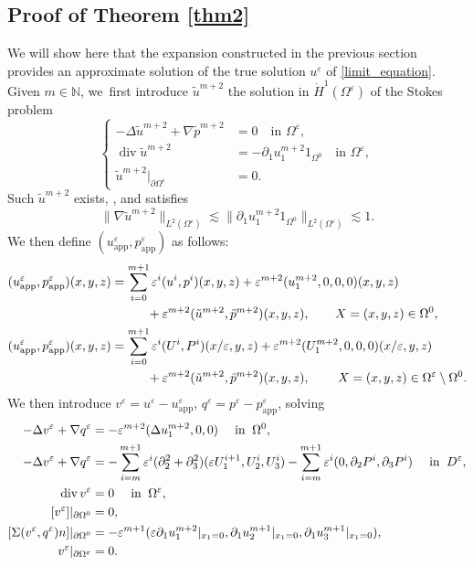 \documentclass[10pt]{amsart}
\newcommand{\app}{\mathrm{app}}
\renewcommand{\div}{\operatorname{div}}
\theoremstyle{plain}
\theoremstyle{definition}
\let\pa\partial
\let\na\nabla
\let\eps\varepsilon
\newcommand{\N}{\mathbb{N}}
\begin{document}
\subsection{Proof of Theorem \ref{thm2}}
We will show here that the expansion constructed in the previous section provides an approximate solution of the true solution $u^\eps$ of \eqref{limit_equation}. Given $m \in \N$, we~first introduce $\tilde{u}^{m+2}$ the solution in $\dot{H}^1(\Omega^\eps)$ of the Stokes problem
\begin{equation*}
\left\{
\begin{aligned}
-\Delta \tilde{u}^{m+2} + \na \tilde{p}^{m+2} & = 0 \quad \text{in } \Omega^\eps, \\
\div \tilde{u}^{m+2} & = - \pa_1 u^{m+2}_1 1_{\Omega^0} \quad \text{in } \Omega^\eps, \\
\tilde{u}^{m+2}\vert_{\pa \Omega^\eps} & = 0.
\end{aligned}
\right.
\end{equation*}
Such $\tilde{u}^{m+2}$ exists, \cf \cite[Th.\,IV.3.3]{Galdi}, and satisfies
\[
\|\na \tilde{u}^{m+2}\|_{L^2(\Omega^\eps)} \lesssim \|\pa_1 u^{m+2}_1 1_{\Omega^0} \|_{L^2(\Omega^\eps)} \lesssim 1.
\]
We then define $(u^\eps_{\app}, p^{\eps}_{\app})$ as follows:
\begin{equation*}
\begin{aligned}
(u^\eps_{\app},p^\eps_{\app})(x,y,z) & = \sum_{i=0}^{m+1} \eps^i (u^i, p^i)(x,y,z) + \eps^{m+2} (u^{m+2}_1,0,0,0)(x,y,z) \\
& \hspace*{1cm}+ \eps^{m+2} (\tilde{u}^{m+2},\tilde{p}^{m+2})(x,y,z), \qquad X = (x,y,z) \in \Omega^0, \\
(u^\eps_{\app}, p^\eps_{\app})(x,y,z) & = \sum_{i=0}^{m+1} \eps^i (U^i, P^i)(x/\eps,y,z) + \eps^{m+2} (U^{m+2}_1,0,0,0)(x/\eps,y,z) \\
& \hspace*{1cm}+ \eps^{m+2} (\tilde{u}^{m+2},\tilde{p}^{m+2})(x,y,z), \qquad \: X = (x,y,z) \in \Omega^\eps\setminus\Omega^0.
\end{aligned}
\end{equation*}
We then introduce $v^\eps = u^\eps - u^\eps_{\app}$, $q^\eps = p^\eps - p^\eps_{\app}$, solving
\begin{align}
-\Delta v^\eps + \na q^\eps & = - \eps^{m+2} (\Delta u^{m+2}_1,0,0) \quad \text{ in } \: \Omega^0,\notag \\
-\Delta v^\eps + \na q^\eps & = - \sum_{i=m}^{m+1} \eps^i (\pa^2_2 + \pa^2_3) (\eps U^{i+1}_1,U^i_2,U^i_3) - \sum_{i=m}^{m+1} \eps^i (0, \pa_2 P^i, \pa_3 P^i) \quad \text{ in } \: D^\eps, \notag \\
\div v^\eps & = 0 \quad \text{ in } \: \Omega^\eps, \\
[v^\eps]\vert_{\pa \Omega^0} & = 0, \notag\\
[\Sigma(v^\eps,q^\eps)n]\vert_{\pa \Omega^0} & = - \eps^{m+1}(\eps \pa_1 u^{m+2}_1\vert_{x_1=0},\pa_1 u^{m+1}_2\vert_{x_1=0}, \pa_1 u^{m+1}_3\vert_{x_1=0}), \notag \\
v^\eps \vert_{\pa \Omega^\eps} & = 0. \notag
\end{align}
\end{document}
